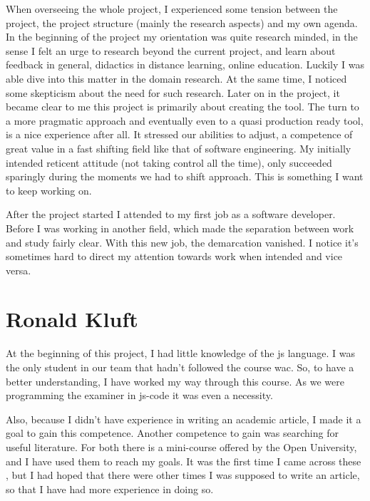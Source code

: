 When overseeing the whole project, I experienced some tension between the
project, the project structure (mainly the research aspects) and my own agenda.
In the beginning of the project my orientation was quite research minded, in the
sense I felt an urge to research beyond the current project, and learn about 
feedback in general, didactics in distance learning, online education. Luckily
I was able dive into this matter in the domain research. At the same time, I
noticed some skepticism about the need for such research. Later on in the 
project, it became clear to me this project is primarily about creating the 
tool. The turn to a more pragmatic approach and eventually even to a quasi 
production ready tool, is a nice experience after all. It stressed our 
abilities to adjust, a competence of great value in a fast shifting field like 
that of software engineering. My initially intended reticent attitude (not taking control all the time), only succeeded sparingly during the moments we had to shift approach. This is something I want to keep working on.

After the project started I attended to my first job as a software developer. 
Before I was working in another field, which made the separation between work 
and study fairly clear. With this new job, the demarcation vanished. I notice 
it's sometimes hard to direct my attention towards work when intended and vice 
versa. 


\section{Ronald Kluft}

At the beginning of this project, I had little knowledge of the \gls{js}
language. I was the only student in our team that hadn't followed the course
\gls{wac}. So, to have a better understanding, I have worked my way through
this course.
As we were programming the \gls{examiner} in \gls{js-code} it was even a necessity.

Also, because I didn't have experience in writing an academic article, I
made it a goal to gain this competence.
Another competence to gain was searching for useful literature.
For both there is a mini-course offered by the Open University, and I have
used them to reach my goals.
It was the first time I came across these , but I had hoped that there were
other times I was supposed to write an article, so that I have had more
experience in doing so.

